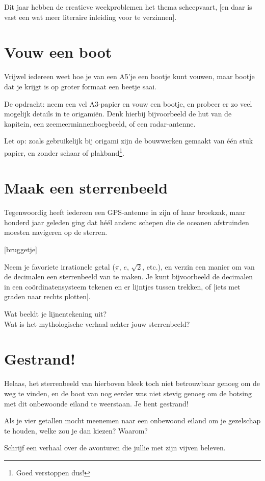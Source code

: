 \documentclass{weekprobleem}
\begin{document}

Dit jaar hebben de creatieve weekproblemen het thema scheepvaart, [en daar is vast een wat meer literaire inleiding voor te verzinnen].

\section*{Vouw een boot}

Vrijwel iedereen weet hoe je van een A5'je een bootje kunt vouwen, maar bootje dat je krijgt is op groter formaat een beetje saai.

De opdracht: neem een vel A3-papier en vouw een bootje, en probeer er zo veel mogelijk details in te origamiën.
Denk hierbij bijvoorbeeld de hut van de kapitein, een zeemeerminnenboegbeeld, of een radar-antenne.

Let op: zoals gebruikelijk bij origami zijn de bouwwerken gemaakt van één stuk papier, en zonder schaar of plakband\footnote{Goed verstoppen dus!}.


\section*{Maak een sterrenbeeld}

Tegenwoordig heeft iedereen een GPS-antenne in zijn of haar broekzak, maar honderd jaar geleden ging dat héél anders: schepen die de oceanen afstruinden moesten navigeren op de sterren.

[bruggetje]

Neem je favoriete irrationele getal ($\pi$, $e$, $\sqrt{2}$, etc.), en verzin een manier om van de decimalen een sterrenbeeld van te maken.
Je kunt bijvoorbeeld de decimalen in een coördinatensysteem tekenen en er lijntjes tussen trekken, of [iets met graden naar rechts plotten].

Wat beeldt je lijnentekening uit?\\
Wat is het mythologische verhaal achter jouw sterrenbeeld?


\section*{Gestrand!}

Helaas, het sterrenbeeld van hierboven bleek toch niet betrouwbaar genoeg om de weg te vinden, en de boot van nog eerder was niet stevig genoeg om de botsing met dit onbewoonde eiland te weerstaan. Je bent gestrand!

Als je vier getallen mocht meenemen naar een onbewoond eiland om je gezelschap te houden, welke zou je dan kiezen? Waarom?

Schrijf een verhaal over de avonturen die jullie met zijn vijven beleven.
\end{document}
